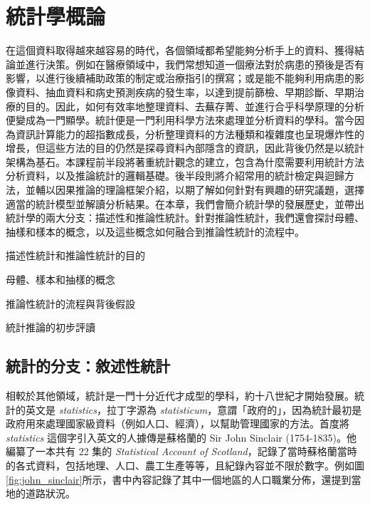 \chapter{統計學概論}
    在這個資料取得越來越容易的時代，各個領域都希望能夠分析手上的資料、獲得結論並進行決策。例如在醫療領域中，我們常想知道一個療法對於病患的預後是否有影響，以進行後續補助政策的制定或治療指引的撰寫；或是能不能夠利用病患的影像資料、抽血資料和病史預測疾病的發生率，以達到提前篩檢、早期診斷、早期治療的目的。因此，如何有效率地整理資料、去蕪存菁、並進行合乎科學原理的分析便變成為一門顯學。統計便是一門利用科學方法來處理並分析資料的學科。當今因為資訊計算能力的超指數成長，分析整理資料的方法種類和複雜度也呈現爆炸性的增長，但這些方法的目的仍然是探尋資料內部隱含的資訊，因此背後仍然是以統計架構為基石。本課程前半段將著重統計觀念的建立，包含為什麼需要利用統計方法分析資料，以及推論統計的邏輯基礎。後半段則將介紹常用的統計檢定與迴歸方法，並輔以因果推論的理論框架介紹，以期了解如何針對有興趣的研究議題，選擇適當的統計模型並解讀分析結果。在本章，我們會簡介統計學的發展歷史，並帶出統計學的兩大分支：描述性和推論性統計。針對推論性統計，我們還會探討母體、抽樣和樣本的概念，以及這些概念如何融合到推論性統計的流程中。

\begin{introduction}
    \item 描述性統計和推論性統計的目的
    \item 母體、樣本和抽樣的概念
    \item 推論性統計的流程與背後假設
    \item 統計推論的初步評讀
\end{introduction}

\section{統計的分支：敘述性統計}
    相較於其他領域，統計是一門十分近代才成型的學科，約十八世紀才開始發展。統計的英文是 \textit{statistics}，拉丁字源為 \textit{statisticum}，意謂「政府的」，因為統計最初是政府用來處理國家級資料（例如人口、經濟），以幫助管理國家的方法。首度將 \textit{statistics} 這個字引入英文的人據傳是蘇格蘭的 Sir John Sinclair (1754-1835)。他編纂了一本共有 22 集的 \textit{Statistical Account of Scotland}，記錄了當時蘇格蘭當時的各式資料，包括地理、人口、農工生產等等，且紀錄內容並不限於數字。例如圖\ref{fig:john_sinclair}所示，書中內容記錄了其中一個地區的人口職業分佈，還提到當地的道路狀況。

